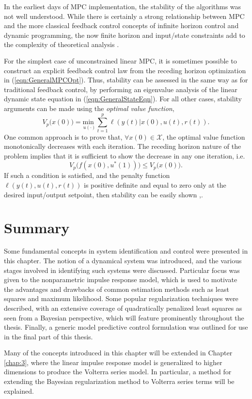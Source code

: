 In the earliest days of MPC implementation, the stability of the algorithms was not well understood. While there is certainly a strong relationship between MPC and the more classical feedback control concepts of infinite horizon control and dynamic programming, the now finite horizon and input/state constraints add to the complexity of theoretical analysis \cite{Mayne2000}.

For the simplest case of unconstrained linear MPC, it is sometimes possible to construct an explicit feedback control law from the receding horizon optimization in (\ref{eqn:GeneralMPCOpt}). Thus, stability can be assessed in the same way as for traditional feedback control, by performing an eigenvalue analysis of the linear dynamic state equation in (\ref{eqn:GeneralStateEqn}). For all other cases, stability arguments can be made using the \emph{optimal value function},
\begin{equation}
V_p \big( x(0) \big) = \underset{u(\cdot)}{\text{min }} \sum_{t=1}^{p} \ell(y(t)|x(0),u(t),r(t)). \label{eqn:GeneralOptValue}
\end{equation}
One common approach is to prove that, $\forall x(0) \in \mathcal{X}$, the optimal value function monotonically decreases with each iteration. The receding horizon nature of the problem implies that it is sufficient to show the decrease in any one iteration, i.e.
\begin{equation}
V_p \big( f(x(0),u^*(1)) \big) \leq V_p \big( x(0) \big).
\end{equation}
If such a condition is satisfied, and the penalty function $\ell(y(t),u(t),r(t))$ is positive definite and equal to zero only at the desired input/output setpoint, then stability can be easily shown \cite{Mayne2000},\cite{Grune2011}.

\section{Summary}

Some fundamental concepts in system identification and control were presented in this chapter. The notion of a dynamical system was introduced, and the various stages involved in identifying such systems were discussed. Particular focus was given to the nonparametric impulse response model, which is used to motivate the advantages and drawbacks of common estimation methods such as least squares and maximum likelihood. Some popular regularization techniques were described, with an extensive coverage of quadratically penalized least squares as seen from a Bayesian perspective, which will feature prominently throughout the thesis. Finally, a generic model predictive control formulation was outlined for use in the final part of this thesis.

Many of the concepts introduced in this chapter will be extended in Chapter \ref{chap:3}, where the linear impulse response model is generalized to higher dimensions to produce the Volterra series model. In particular, a method for extending the Bayesian regularization method to Volterra series terms will be explained.